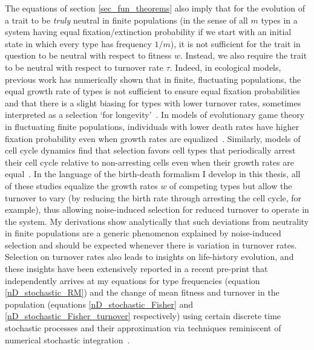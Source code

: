 The equations of section \ref{sec_fun_theorems} also imply that for the evolution of a trait to be \emph{truly} neutral in finite populations (in the sense of all $m$ types in a system having equal fixation/extinction probability if we start with an initial state in which every type has frequency $1/m$), it is not sufficient for the trait in question to be neutral with respect to fitness $w$. Instead, we also require the trait to be neutral with respect to turnover rate $\tau$.  Indeed, in ecological models, previous work has numerically shown that in finite, fluctuating populations, the equal growth rate of types is not sufficient to ensure equal fixation probabilities and that there is a slight biasing for types with lower turnover rates, sometimes interpreted as a selection `for longevity'~\citep{lin_features_2012, oliveira_advantage_2017,balasekaran_quasi-neutral_2022}. In models of evolutionary game theory in fluctuating finite populations, individuals with lower death rates have higher fixation probability even when growth rates are equalized~\citep{huang_stochastic_2015, czuppon_fixation_2018}. Similarly, models of cell cycle dynamics find that selection favors cell types that periodically arrest their cell cycle relative to non-arresting cells even when their growth rates are equal~\citep{wodarz_effect_2017}. In the language of the birth-death formalism I develop in this thesis, all of these studies equalize the growth rates $w$ of competing types but allow the turnover to vary (by reducing the birth rate through arresting the cell cycle, for example), thus allowing noise-induced selection for reduced turnover to operate in the system. My derivations show analytically that such deviations from neutrality in finite populations are a generic phenomenon explained by noise-induced selection and should be expected whenever there is variation in turnover rates. Selection on turnover rates also leads to insights on life-history evolution, and these insights have been extensively reported in a recent pre-print that independently arrives at my equations for type frequencies (equation \eqref{nD_stochastic_RM}) and the change of mean fitness and turnover in the population (equations \eqref{nD_stochastic_Fisher} and \eqref{nD_stochastic_Fisher_turnover} respectively) using certain discrete time stochastic processes and their approximation via techniques reminiscent of numerical stochastic integration~\citep{kuosmanen_turnover_2022}. 

